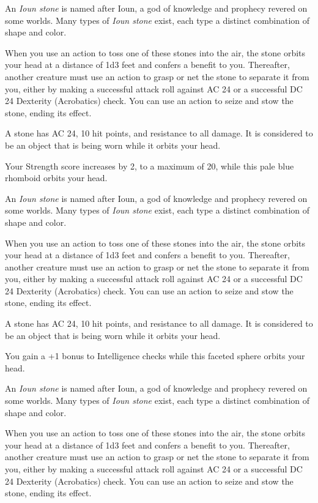 \documentclass[10pt,a4paper,twoside,bg=print,twocolumn,openany,nodeprecatedcode]{dndbook}
\begin{document}
An \textit{Ioun stone} is named after Ioun, a god of knowledge and prophecy revered on some worlds. Many types of \textit{Ioun stone} exist, each type a distinct combination of shape and color.

When you use an action to toss one of these stones into the air, the stone orbits your head at a distance of 1d3 feet and confers a benefit to you. Thereafter, another creature must use an action to grasp or net the stone to separate it from you, either by making a successful attack roll against AC 24 or a successful DC 24 Dexterity (Acrobatics) check. You can use an action to seize and stow the stone, ending its effect.

A stone has AC 24, 10 hit points, and resistance to all damage. It is considered to be an object that is being worn while it orbits your head.

Your Strength score increases by 2, to a maximum of 20, while this pale blue rhomboid orbits your head.

An \textit{Ioun stone} is named after Ioun, a god of knowledge and prophecy revered on some worlds. Many types of \textit{Ioun stone} exist, each type a distinct combination of shape and color.

When you use an action to toss one of these stones into the air, the stone orbits your head at a distance of 1d3 feet and confers a benefit to you. Thereafter, another creature must use an action to grasp or net the stone to separate it from you, either by making a successful attack roll against AC 24 or a successful DC 24 Dexterity (Acrobatics) check. You can use an action to seize and stow the stone, ending its effect.

A stone has AC 24, 10 hit points, and resistance to all damage. It is considered to be an object that is being worn while it orbits your head.

You gain a +1 bonus to Intelligence checks while this faceted sphere orbits your head.

An \textit{Ioun stone} is named after Ioun, a god of knowledge and prophecy revered on some worlds. Many types of \textit{Ioun stone} exist, each type a distinct combination of shape and color.

When you use an action to toss one of these stones into the air, the stone orbits your head at a distance of 1d3 feet and confers a benefit to you. Thereafter, another creature must use an action to grasp or net the stone to separate it from you, either by making a successful attack roll against AC 24 or a successful DC 24 Dexterity (Acrobatics) check. You can use an action to seize and stow the stone, ending its effect.
\end{document}

